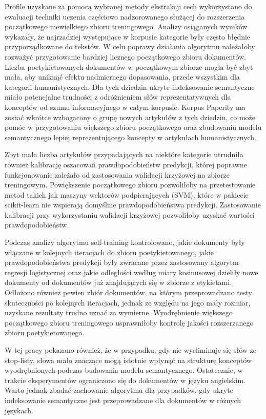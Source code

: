 \documentclass{pracamgr}
\begin{document}
Profile uzyskane za pomocą wybranej metody ekstrakcji cech wykorzystano do ewaluacji techniki uczenia częściowo nadzorowanego służącej do rozszerzenia początkowego niewielkiego zbioru treningowego. Analizy osiąganych wyników wykazały, że najrzadziej występujące w korpusie kategorie były często błędnie przyporządkowane do tekstów. W celu poprawy działania algorytmu należałoby rozważyć przygotowanie bardziej licznego początkowego zbioru dokumentów. Liczba poetykietowanych dokumentów w początkowym zbiorze mogła być zbyt mała, aby uniknąć efektu nadmiernego dopasowania, przede wszystkim dla kategorii humanistycznych. Dla tych dziedzin ukryte indeksowanie semantyczne miało potencjalne trudności z odróżnieniem słów reprezentatywnych dla konceptów od szumu informacyjnego w całym korpusie. Korpus Paperity ma zostać wkrótce wzbogacony o grupę nowych artykułów z tych dziedzin, co może pomóc w przygotowaniu większego zbioru początkowego oraz zbudowaniu modelu semantycznego lepiej reprezentującego koncepty w artykułach humanistycznych. 

Zbyt mała liczba artykułów przypadających na niektóre kategorie utrudniła również kalibrację oszacowań prawdopodobieństw predykcji, której poprawne funkcjonowanie zależało od zastosowania walidacji krzyżowej na zbiorze treningowym. Powiększenie początkowego zbioru pozwoliłoby na przetestowanie metod takich jak maszyny wektorów podpierających (SVM), które w pakiecie scikit-learn nie wspierają domyślnie prawdopodobieństwa predykcji. Zastosowanie kalibracji przy wykorzystaniu walidacji krzyżowej pozwoliłoby uzyskać wartości prawdopodobieństw. 

Podczas analizy algorytmu self-training kontrolowano, jakie dokumenty były włączane w kolejnych iteracjach do zbioru poetykietowanego, jakie prawdopodobieństwa predykcji były zwracane przez zastosowany algorytm regresji logistycznej oraz jakie odległości według miary kosinusowej dzieliły nowe dokumenty od dokumentów już znajdujących się w zbiorze z etykietami. Odłożono również pewien zbiór dokumentów, na którym przeprowadzano testy skuteczności po kolejnych iteracjach, jednak ze względu na jego mały rozmiar, uzyskane rezultaty trudno uznać za wymierne. Wyodrębnienie większego początkowego zbioru treningowego usprawniłoby
kontrolę jakości rozszerzanego zbioru poetykietowanego.

W tej pracy pokazano również, że w przypadku, gdy nie wyeliminuje się słów ze stop-listy, słowa mało znaczące mogą istotnie wpłynąć na strukturę konceptów wyodrębnionych podczas budowania modelu semantycznego. Ostatecznie, w trakcie eksperymentów ograniczono się do dokumentów w języku angielskim. Warto jednak zbadać zachowanie algorytmu dla przypadków, gdy ukryte indeksowanie semantyczne jest przeprowadzane dla dokumentów w różnych językach.
\end{document}

